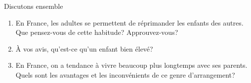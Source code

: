 \begin{frame}{Discutons ensemble}
  \begin{enumerate}
    \item En France, les adultes se permettent de réprimander les enfants des autres. Que pensez-vous de cette habitude? Approuvez-vous?
    \item<2-> À vos avis, qu'est-ce qu'un enfant bien élevé?
    \item<3-> En France, on a tendance à vivre beaucoup plus longtemps avec ses parents. Quels sont les avantages et les inconvénients de ce genre d'arrangement?
  \end{enumerate}
\end{frame}